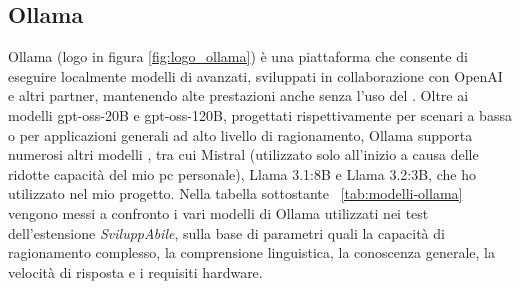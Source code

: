 \subsection{Ollama}
\label{subsec:ollama}
\noindent Ollama (logo in figura \ref{fig:logo_ollama}) è una piattaforma che consente di eseguire localmente modelli di  avanzati, sviluppati in collaborazione con OpenAI e altri partner, mantenendo alte prestazioni anche senza l’uso del . 
Oltre ai modelli gpt-oss-20B e gpt-oss-120B, progettati rispettivamente per scenari a bassa  o per applicazioni generali ad alto livello di ragionamento, Ollama supporta numerosi altri modelli , tra cui Mistral (utilizzato solo all’inizio a causa delle ridotte capacità del mio pc personale), Llama 3.1:8B e Llama 3.2:3B, che ho utilizzato nel mio progetto. Nella tabella sottostante ~\ref{tab:modelli-ollama} vengono messi a confronto i vari modelli di Ollama utilizzati nei test dell'estensione \textit{SviluppAbile}, sulla base di parametri quali la capacità di ragionamento complesso, la comprensione linguistica, la conoscenza generale, la velocità di risposta e i requisiti hardware.\.\\ 

